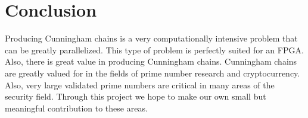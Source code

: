 \documentclass[journal]{IEEEtran}
\begin{document}
\section{Conclusion}
Producing Cunningham chains is a very computationally intensive problem that can be greatly parallelized. This type of problem is perfectly suited for an FPGA. Also, there is great value in producing Cunningham chains. Cunningham chains are greatly valued for in the fields of prime number research and cryptocurrency. Also, very large validated prime numbers are critical in many areas of the security field. Through this project we hope to make our own small but meaningful contribution to these areas.






%



\end{document}
